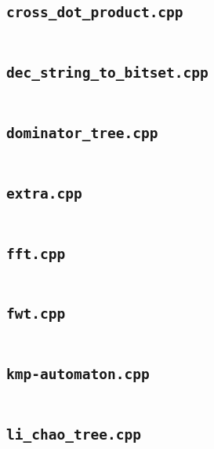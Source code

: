 \subsection*{\texttt{cross\_dot\_product.cpp}} \label{sec:7_7_New_file3}
\inputminted[fontsize=\footnotesize, linenos, breaklines]{cpp}{./7\ New/cross_dot_product.cpp}

\subsection*{\texttt{dec\_string\_to\_bitset.cpp}} \label{sec:7_7_New_file4}
\inputminted[fontsize=\footnotesize, linenos, breaklines]{cpp}{./7\ New/dec_string_to_bitset.cpp}

\subsection*{\texttt{dominator\_tree.cpp}} \label{sec:7_7_New_file5}
\inputminted[fontsize=\footnotesize, linenos, breaklines]{cpp}{./7\ New/dominator_tree.cpp}

\subsection*{\texttt{extra.cpp}} \label{sec:7_7_New_file6}
\inputminted[fontsize=\footnotesize, linenos, breaklines]{cpp}{./7\ New/extra.cpp}

\subsection*{\texttt{fft.cpp}} \label{sec:7_7_New_file7}
\inputminted[fontsize=\footnotesize, linenos, breaklines]{cpp}{./7\ New/fft.cpp}

\subsection*{\texttt{fwt.cpp}} \label{sec:7_7_New_file8}
\inputminted[fontsize=\footnotesize, linenos, breaklines]{cpp}{./7\ New/fwt.cpp}

\subsection*{\texttt{kmp-automaton.cpp}} \label{sec:7_7_New_file9}
\inputminted[fontsize=\footnotesize, linenos, breaklines]{cpp}{./7\ New/kmp-automaton.cpp}

\subsection*{\texttt{li\_chao\_tree.cpp}} \label{sec:7_7_New_file10}
\inputminted[fontsize=\footnotesize, linenos, breaklines]{cpp}{./7\ New/li_chao_tree.cpp}

